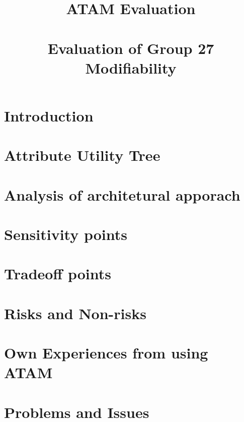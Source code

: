 \documentclass[a4paper, 11pt]{article}
\title{\textbf{ATAM Evaluation}\\\HRule\\Evaluation of Group 27\\\small Modifiability}
\begin{document}
\maketitle
\clearpage
\section{Introduction}

\section{Attribute Utility Tree}

\section{Analysis of architetural apporach}

\clearpage
\section{Sensitivity points}

\clearpage
\section{Tradeoff points}

\section{Risks and Non-risks}

\section{Own Experiences from using ATAM}

\section{Problems and Issues}

\end{document}
